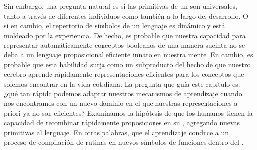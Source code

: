 
Sin embargo, una pregunta natural es si las primitivas de un \lot son universales, tanto a través de diferentes individuos como también a lo largo del desarrollo. O si en cambio, el repertorio de símbolos de un lenguaje es dinámico y está moldeado por la experiencia. De hecho, es probable que nuestra capacidad para representar automáticamente conceptos booleanos de una manera sucinta no se deba a un lenguaje proposicional eficiente innato en nuestra mente. En cambio, es probable que esta habilidad surja como un subproducto del hecho de que nuestro cerebro aprende rápidamente representaciones eficientes para los conceptos que solemos encontrar en la vida cotidiana. La pregunta que guía este capítulo es: ¿qué tan rápido podemos adaptar nuestros mecanismos de aprendizaje cuando nos encontramos con un nuevo dominio en el que nuestras representaciones a priori ya no son eficientes? Examinamos la hipótesis de que los humanos tienen la capacidad de recombinar rápidamente proposiciones en su \lot, agregando nuevas primitivas al lenguaje. En otras palabras, que el aprendizaje conduce a un proceso de compilación de rutinas en nuevos símbolos de funciones dentro del \lot.


